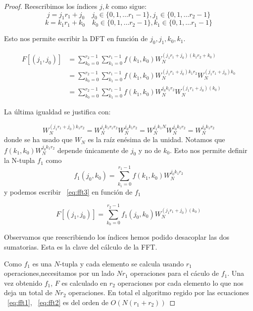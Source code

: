 \begin{proof}
    \noindent Reescribimos los índices $j,k$ como sigue:
\begin{equation*}
    j = j_1r_1+j_0  \quad  j_0 \in \{0,1,\ldots r_1-1\}, j_1 \in \{0,1,\ldots r_2-1\}
\end{equation*}
\begin{equation*}
     k = k_1r_1+k_0   \quad  k_0 \in \{0,1,\ldots r_2-1\}, k_1 \in \{0,1,\ldots r_1-1\}
\end{equation*}

\noindent Esto nos permite escribir la DFT en función de $j_0,j_1,k_0,k_1$.

\begin{align}
    F[(j_1,j_0)] &= \sum_{k_0=0}^{r_2-1}  \sum_{k_1=0}^{r_1-1} f(k_1,k_0) W_N^{(j_1r_1+j_0)(k_1r_2+k_0)} \nonumber \\
    &= \sum_{k_0=0}^{r_2-1}  \sum_{k_1=0}^{r_1-1} f(k_1,k_0) W_N^{(j_1r_1+j_0)k_1r_2}W_N^{(j_1r_1+j_0)k_0}  \nonumber \\
    &= \sum_{k_0=0}^{r_2-1}  \sum_{k_1=0}^{r_1-1} f(k_1,k_0) W_N^{j_0k_1r_2}W_N^{(j_1r_1+j_0)(k_0)}  \label{eq:fft3}
\end{align}

\noindent La última igualdad se justifica con:

\begin{equation}
    W_N^{(j_1r_1+j_0)k_1r_2} =  W_N^{j_1k_1r_1r_2}W_N^{j_0k_1r_2}=
    W_N^{j_1k_1N}W_N^{j_0k_1r_2}=W_N^{j_0k_1r_2}
\end{equation}
\noindent donde se ha usado que $W_N$ es la raíz enésima de la unidad.
Notamos que $f(k_1,k_0) W_N^{j_0k_1r_2}$ depende únicamente de $j_0$ y no de $k_0$. Esto nos permite definir la N-tupla $f_1$ como 
\begin{equation}\label{eq:fft1}
    f_1(j_0,k_0) = \sum_{k_1=0}^{r_1-1} f(k_1,k_0) W_N^{j_0k_1r_2}
\end{equation}
y podemos escribir ~\eqref{eq:fft3} en función de $f_1$

\begin{equation}\label{eq:fft2}
    F[(j_1,j_0)] = \sum_{k_0=0}^{r_2-1}  f_1(j_0,k_0)W_N^{(j_1r_1+j_0)(k_0)} 
\end{equation}

\noindent Observamos que reescribiendo los índices hemos podido desacoplar las dos sumatorias. Esta es la clave del cálculo de la FFT.


\indent Como $f_1$ es una $N$-tupla y cada elemento se calcula usando $r_1$ operaciones,necesitamos por un lado $Nr_1$ operaciones para el cáculo de $f_1$. Una vez obtenido $f_1$, $F$ es calculado en $r_2$ operaciones por cada elemento lo que nos deja un total de $Nr_2$ operaciones.
En total el algoritmo regido por las ecuaciones  ~\eqref{eq:fft1}, ~\eqref{eq:fft2} es del orden de $O(N(r_1+r_2))$
\end{proof}


